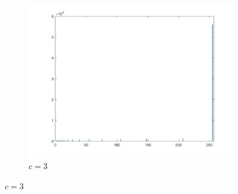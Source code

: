 \documentclass{article}
\begin{document}
\begin{enumerate}[label=(\alph*)]
\begin{figure}[!htb]
        ~
        \begin{subfigure}[b]{0.3\textwidth}
            \includegraphics[width=\textwidth]{img/hist_ILT3.png}
            \caption{$c = 3$}
        \end{subfigure}
        
        

\end{figure}
\end{enumerate}
\end{document}
